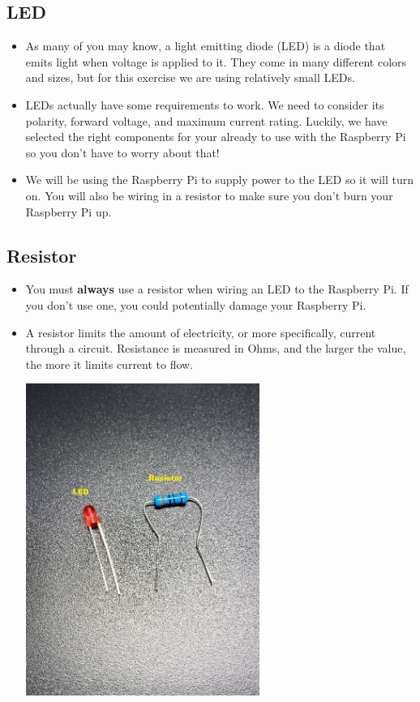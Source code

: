 \documentclass{article}\usepackage[]{graphicx}\usepackage[]{color}
\begin{document}
\subsection{LED}

\begin{itemize}
\item As many of you may know, a light emitting diode (LED) is a diode that emits light when voltage is applied to it. They come in many different colors and sizes, but for this exercise we are using relatively small LEDs.
\item LEDs actually have some requirements to work. We need to consider its polarity, forward voltage, and maximum current rating. Luckily, we have selected the right components for your already to use with the Raspberry Pi so you don't have to worry about that!
\item We will be using the Raspberry Pi to supply power to the LED so it will turn on. You will also be wiring in a resistor to make sure you don't burn your Raspberry Pi up.
\end{itemize}

\subsection{Resistor}

\begin{itemize}
\item You must \textbf{always} use a resistor when wiring an LED to the Raspberry Pi. If you don't use one, you could potentially damage your Raspberry Pi.
\item A resistor limits the amount of electricity, or more specifically, current through a circuit. Resistance is measured in Ohms, and the larger the value, the more it limits current to flow.
\newline
\begin{center}
\includegraphics[width=0.60\textwidth]{ledres}
\end{center}
\end{itemize}
\end{document}
